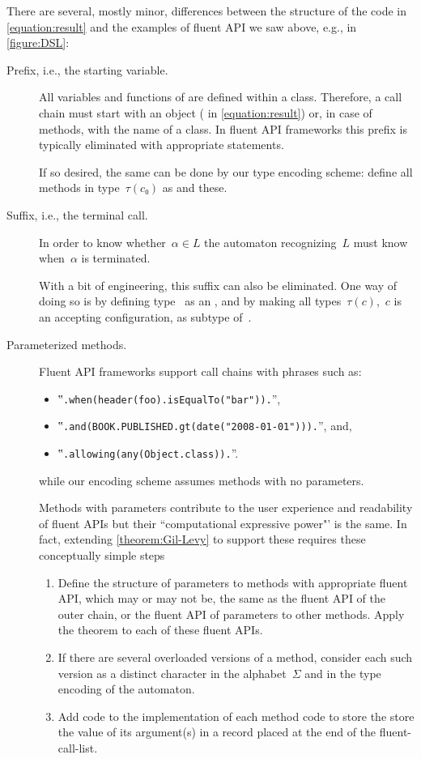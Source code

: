 There are several, mostly minor, differences between the structure of the \Java code
in \cref{equation:result}
and the examples of fluent API we saw above, e.g., in \cref{figure:DSL}:
\begin{description}
  \item[Prefix, i.e., the starting  variable.]
  All variables and functions of \Java are defined within a class.
  Therefore, a call chain must start with an object ( in \cref{equation:result})
  or, in case of  methods, with the name of a class.
  In fluent API frameworks this prefix is typically eliminated
  with appropriate  statements.
  \par
  If so desired, the same can be done by our type encoding scheme: define all
  methods in type~$τ(c₀)$ as  and  these.
  \item[Suffix, i.e., the terminal  call.]
  In order to know whether~$α∈L$ the automaton recognizing~$L$ must
  know when~$α$ is terminated.
  \par
  With a bit of engineering, this suffix can also be eliminated.
  One way of doing so is by defining type~ as an , and by making all types~$τ(c)$,~$c$ is
  an accepting configuration, as subtype of~.
  \item[Parameterized methods.]
  Fluent API frameworks support call chains with phrases such as:
  \begin{itemize}
    \item ‟\lstinline{.when(header(foo).isEqualTo("bar")).}”,
    \item ‟\lstinline{.and(BOOK.PUBLISHED.gt(date("2008-01-01"))).}”, and,
    \item ‟\lstinline{.allowing(any(Object.class)).}”.
  \end{itemize}
  while our encoding scheme assumes methods with no parameters.  
  \par
    Methods with parameters contribute to the user
      experience and readability of fluent APIs but their ``computational expressive power"' is the same.
      In fact, extending
      \cref{theorem:Gil-Levy} to support these requires these conceptually simple steps 
      \begin{enumerate}
        \item Define the structure of parameters to methods with appropriate fluent API, which may or
          may not be, the same as the fluent API of the outer chain, or the fluent API of parameters to
          other methods. Apply the theorem to each of these fluent APIs.
        \item
          If there are several overloaded versions of a method, consider each such version as a distinct
          character in the alphabet~$Σ$ and in the type encoding of the automaton.
        \item
          Add code to the implementation of each method code to store the 
          store the value of its argument(s) in a record placed at the end of the fluent-call-list. 
      \end{enumerate}
\end{description}
